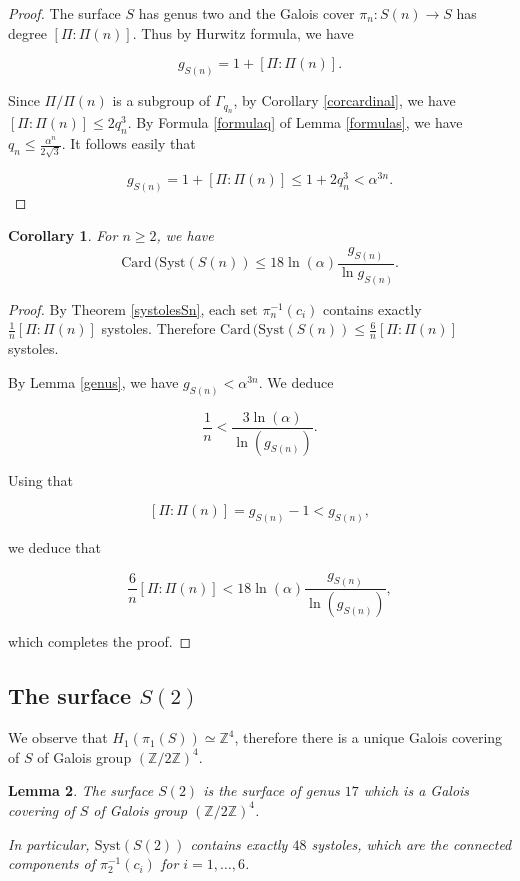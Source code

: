 \documentclass[12pt]{amsart}
\newcommand{\Z}{\mathbb{Z}}
\newcommand{\Card}{\mathrm{Card\,}}
\newcommand{\Syst}{{\mathrm {Syst}}}
\newtheorem{lemma}{Lemma}
\newtheorem{cor}[lemma]{Corollary}
\begin{document}
\begin{proof}  The surface $S$ has genus two and
the Galois cover $\pi_n:S(n)\to S$ has degree 
$[\Pi:\Pi(n)]$. Thus by Hurwitz formula, we have

$$g_{S(n)}=1+[\Pi:\Pi(n)].$$


Since $\Pi/\Pi(n)$ is a subgroup of
$\Gamma_{q_n}$, by Corollary \ref{corcardinal}, we have
$[\Pi:\Pi(n)]\leq 2q_n^3$. By Formula \ref{formulaq} of Lemma \ref{formulas}, we have
$q_n\leq \frac{\alpha^n}{2\sqrt{3}}$. It follows easily that

 $$g_{S(n)}=1+[\Pi:\Pi(n)]\leq 1+2q_n^3<\alpha^{3n}.$$
\end{proof}

\begin{cor}\label{estimate} For $n\geq 2$, we have
$$\Card(\Syst(S(n))\leq 18\ln(\alpha)\frac{g_{S(n)}}{\ln g_{S(n)}}.$$
\end{cor}

\begin{proof}  By Theorem 
\ref{systolesSn},
each set $\pi_n^{-1}(c_i)$ contains exactly 
$\frac{1}{n} [\Pi:\Pi(n)]$ systoles.
Therefore 
$\Card(\Syst(S(n))\leq\frac{6}{n} [\Pi:\Pi(n)]$ systoles.

By Lemma \ref{genus}, we have $g_{S(n)}<\alpha^{3n}$. We deduce

$$\frac{1}{n}<\frac{3\ln(\alpha)}{\ln(g_{S(n)})}.$$

Using that 

$$[\Pi:\Pi(n)]=g_{S(n)}-1<g_{S(n)},$$

we deduce that

$$\frac{6}{n} [\Pi:\Pi(n)]
<18 \ln(\alpha)\frac{g_{S(n)}}{\ln(g_{S(n)})},$$

\noindent which completes the proof.
\end{proof}

\subsection{The surface $S(2)$}

We observe that $H_1(\pi_1(S))\simeq \Z^4$, therefore there is a unique
Galois covering of $S$ of Galois group $(\Z/2\Z)^4$.

\begin{lemma} The surface $S(2)$ is the surface of genus $17$
which is a Galois covering of $S$ of Galois group $(\Z/2\Z)^4$.

In particular, $\Syst(S(2))$ contains exactly $48$ systoles,
which are the connected components of $\pi_2^{-1}(c_i)$ for $i=1,\ldots, 6$.
\end{lemma}
\end{document}
